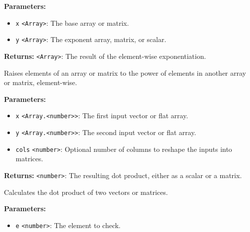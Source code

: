 \documentclass[12pt,a4paper]{article}
\begin{document}
\vspace{5mm}
\noindent {}


\noindent \textbf{Parameters:}
\begin{itemize}
  \item \texttt{x} \texttt{<Array>}: The base array or matrix.
  \item \texttt{y} \texttt{<Array>}: The exponent array, matrix, or scalar.
\end{itemize}

\noindent \textbf{Returns:} \texttt{<Array>}: The result of the element-wise exponentiation.

\noindent Raises elements of an array or matrix to the power of elements in another array or matrix, element-wise.

\vspace{5mm}
\noindent {}


\noindent \textbf{Parameters:}
\begin{itemize}
  \item \texttt{x} \texttt{<Array.<number>>}: The first input vector or flat array.
  \item \texttt{y} \texttt{<Array.<number>>}: The second input vector or flat array.
  \item \texttt{cols} \texttt{<number>}: Optional number of columns to reshape the inputs into matrices.
\end{itemize}

\noindent \textbf{Returns:} \texttt{<number>}: The resulting dot product, either as a scalar or a matrix.

\noindent Calculates the dot product of two vectors or matrices.

\vspace{5mm}
\noindent {}


\noindent \textbf{Parameters:}
\begin{itemize}
  \item \texttt{e} \texttt{<number>}: The element to check.
\end{itemize}
\end{document}
